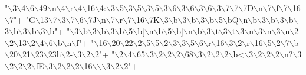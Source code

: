 \begin{DoxyCode}
        \textcolor{stringliteral}{"\(\backslash\)3\(\backslash\)4\(\backslash\)6\(\backslash\)49\(\backslash\)n\(\backslash\)4\(\backslash\)r\(\backslash\)4\(\backslash\)16\(\backslash\)4:\(\backslash\)3\(\backslash\)5\(\backslash\)3\(\backslash\)5\(\backslash\)3\(\backslash\)5\(\backslash\)3\(\backslash\)6\(\backslash\)3\(\backslash\)6\(\backslash\)3\(\backslash\)6\(\backslash\)3\(\backslash\)7\(\backslash\)7\(\backslash\)7D\(\backslash\)n\(\backslash\)7\(\backslash\)f\(\backslash\)7\(\backslash\)16\(\backslash\)7"}+
        \textcolor{stringliteral}{"G\(\backslash\)13\(\backslash\)7\(\backslash\)3\(\backslash\)7\(\backslash\)6\(\backslash\)7J\(\backslash\)n\(\backslash\)7\(\backslash\)r\(\backslash\)7\(\backslash\)16\(\backslash\)7K\(\backslash\)3\(\backslash\)b\(\backslash\)3\(\backslash\)b\(\backslash\)3\(\backslash\)b\(\backslash\)5\(\backslash\)bQ\(\backslash\)n\(\backslash\)b\(\backslash\)3\(\backslash\)b\(\backslash\)3\(\backslash\)b\(\backslash\)3\(\backslash\)b\(\backslash\)3\(\backslash\)b\(\backslash\)3\(\backslash\)b"}+
        \textcolor{stringliteral}{"\(\backslash\)3\(\backslash\)b\(\backslash\)3\(\backslash\)b\(\backslash\)3\(\backslash\)b\(\backslash\)5\(\backslash\)b[\(\backslash\)n\(\backslash\)b\(\backslash\)5\(\backslash\)b]\(\backslash\)n\(\backslash\)b\(\backslash\)3\(\backslash\)t\(\backslash\)3\(\backslash\)t\(\backslash\)3\(\backslash\)n\(\backslash\)3\(\backslash\)n\(\backslash\)3\(\backslash\)n\(\backslash\)2\(\backslash\)2\(\backslash\)13\(\backslash\)2\(\backslash\)4\(\backslash\)6\(\backslash\)b\(\backslash\)n\(\backslash\)f"}+
        \textcolor{stringliteral}{"\(\backslash\)16\(\backslash\)20\(\backslash\)22\(\backslash\)2\(\backslash\)5\(\backslash\)5\(\backslash\)2\(\backslash\)3\(\backslash\)3\(\backslash\)5\(\backslash\)6\(\backslash\)r\(\backslash\)16\(\backslash\)3\(\backslash\)2\(\backslash\)r\(\backslash\)16\(\backslash\)5\(\backslash\)2\(\backslash\)7\(\backslash\)b\(\backslash\)20\(\backslash\)21\(\backslash\)23\(\backslash\)23h\(\backslash\)2-\(\backslash\)3\(\backslash\)2\(\backslash\)2"}+
        \textcolor{stringliteral}{"\(\backslash\)2\(\backslash\)4\(\backslash\)65\(\backslash\)3\(\backslash\)2\(\backslash\)2\(\backslash\)2\(\backslash\)68\(\backslash\)3\(\backslash\)2\(\backslash\)2\(\backslash\)2\(\backslash\)b<\(\backslash\)3\(\backslash\)2\(\backslash\)2\(\backslash\)2\(\backslash\)n?\(\backslash\)3\(\backslash\)2\(\backslash\)2\(\backslash\)2\(\backslash\)fE\(\backslash\)3\(\backslash\)2\(\backslash\)2\(\backslash\)2\(\backslash\)16\(\backslash\)\(\backslash\)\(\backslash\)3\(\backslash\)2\(\backslash\)2"}+

\end{DoxyCode}

